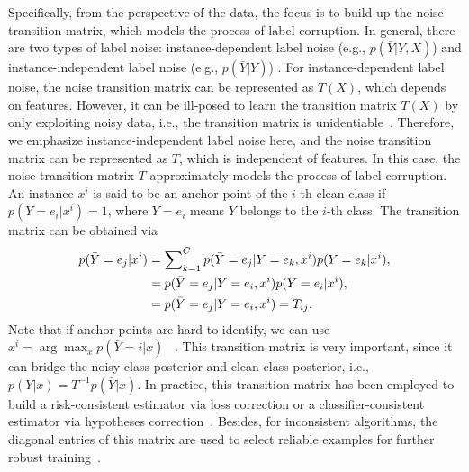 \label{sec:thm:idata}
Specifically, 
from the perspective of the data, the focus is to build up the noise transition matrix, 
which models the process of label corruption. 
In general, there are two types of label noise: 
instance-dependent label noise (e.g., $p(\bar{Y}|Y,X)$)  and instance-independent label noise (e.g., $p(\bar{Y}|Y)$) . 
For instance-dependent label noise, the noise transition matrix can be represented as 
$T(X)$, 
which depends on features. 
However, 
it can be ill-posed to learn the transition matrix $T(X)$ by only exploiting noisy data, 
i.e., the transition matrix is unidentiable~.
Therefore, 
we emphasize instance-independent label noise here, 
and the noise transition matrix can be represented as $T$, 
which is independent of features. 
In this case, the noise transition matrix $T$ approximately models the process of label corruption. 
An instance $x^i$ is said to be an anchor point of the $i$-th clean class if $p(Y = e_i|x^i)=1$, where $Y = e_i$ means $Y$ belongs to the $i$-th class. The transition matrix can be obtained via
\begin{align}
p(\bar{Y} = e_j | x^i) 
& = \sum\nolimits_{k=1}^{C} p(\bar{Y} = e_j | Y = e_k, x^i) p(Y = e_k|x^i),\notag
\\
& = p(\bar{Y} = e_j | Y = e_i, x^i)p(Y = e_i|x^i),\notag
\\
& = p(\bar{Y} = e_j | Y = e_i, x^i) = T_{ij}.\label{eq:trans}
\end{align}
Note that if 
anchor points are hard to identify, we can use $x^i = \arg\max_{x}p(\bar{Y} =i|x)$ ~. This transition matrix is very important, since it can bridge the noisy class posterior and clean class posterior, i.e., $p(Y|x) = T^{-1}p(\bar{Y}|x)$. 
In practice, this transition matrix has been employed to build a risk-consistent estimator via loss correction or a classifier-consistent estimator via hypotheses correction~. 
Besides, for inconsistent algorithms, the diagonal entries of this matrix are used to select reliable examples for further robust training~.

